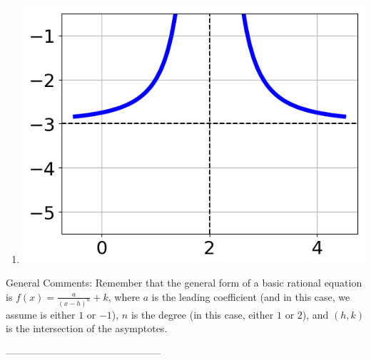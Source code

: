 \documentclass{article}[10pt]
\begin{document}
\begin{enumerate}[label=\Alph*.]
\item  
\begin{center}\includegraphics[scale=0.5]{../Figures/question35BC.png}\end{center} 
 
\end{enumerate} 
 
General Comments: Remember that the general form of a basic rational equation is $ f(x) = \frac{a}{(x-h)^n} + k$, where $a$ is the leading coefficient (and in this case, we assume is either $1$ or $-1$), $n$ is the degree (in this case, either $1$ or $2$), and $(h, k)$ is the intersection of the asymptotes.

-----------------------------------------------
\end{document}
